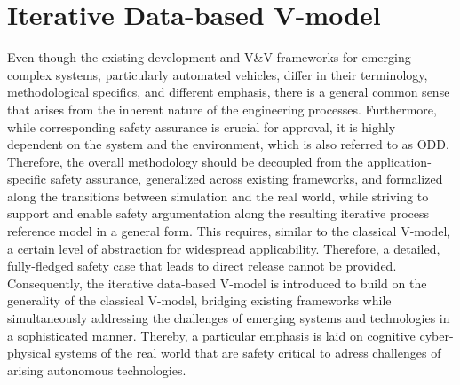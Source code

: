 \section{Iterative Data-based V-model}\label{03_Methodology}

Even though the existing development and V\&V frameworks for emerging complex systems, particularly automated vehicles, differ in their terminology, methodological specifics, and different emphasis, there is a general common sense that arises from the inherent nature of the engineering processes. Furthermore, while corresponding safety assurance is crucial for approval, it is highly dependent on the system and the environment, which is also referred to as ODD. Therefore, the overall methodology should be decoupled from the application-specific safety assurance, generalized across existing frameworks, and formalized along the transitions between simulation and the real world, while striving to support and enable safety argumentation along the resulting iterative process reference model in a general form. This requires, similar to the classical V-model, a certain level of abstraction for widespread applicability. Therefore, a detailed, fully-fledged safety case that leads to direct release cannot be provided. Consequently, the iterative data-based V-model is introduced to build on the generality of the classical V-model, bridging existing frameworks while simultaneously addressing the challenges of emerging systems and technologies in a sophisticated manner. Thereby, a particular emphasis is laid on cognitive cyber-physical systems of the real world that are safety critical to adress challenges of arising autonomous technologies.

